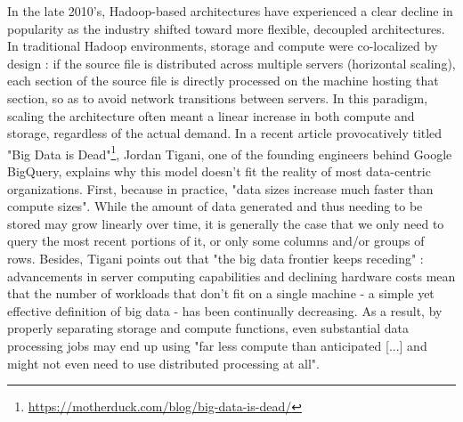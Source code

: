 In the late 2010's, Hadoop-based architectures have experienced a clear decline in popularity as the industry shifted toward more flexible, decoupled architectures. In traditional Hadoop environments, storage and compute were co-localized by design : if the source file is distributed across multiple servers (horizontal scaling), each section of the source file is directly processed on the machine hosting that section, so as to avoid network transitions between servers. In this paradigm, scaling the architecture often meant a linear increase in both compute and storage, regardless of the actual demand. In a recent article provocatively titled "Big Data is Dead"\footnote{\url{https://motherduck.com/blog/big-data-is-dead/}}, Jordan Tigani, one of the founding engineers behind Google BigQuery, explains why this model doesn't fit the reality of most data-centric organizations. First, because in practice, "data sizes increase much faster than compute sizes". While the amount of data generated and thus needing to be stored may grow linearly over time, it is generally the case that we only need to query the most recent portions of it, or only some columns and/or groups of rows. Besides, Tigani points out that "the big data frontier keeps receding" : advancements in server computing capabilities and declining hardware costs mean that the number of workloads that don't fit on a single machine - a simple yet effective definition of big data - has been continually decreasing. As a result, by properly separating storage and compute functions, even substantial data processing jobs may end up using "far less compute than anticipated [...] and might not even need to use distributed processing at all".

